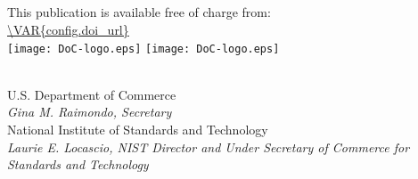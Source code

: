 \begin{titlepage}
\begin{flushright}
\normalsize {}\\
\textit{}\\
\textit{}\\
\textit{}\\
\vfill
\vfill
\normalsize This publication is available free of charge from:\\
\url{\VAR{config.doi_url}}\\
\vfill
\normalsize {}
\vfill
	\texttt{[image: DoC-logo.eps]} 
	\tagmcend\tagstructend
	\texttt{[image: DoC-logo.eps]} 

\\
\vfill
\footnotesize U.S. Department of Commerce\\ 
\textit{Gina M. Raimondo, Secretary}\\
\vspace{10pt}
National Institute of Standards and Technology\\ 
\hspace*{-3cm}\textit{Laurie E. Locascio, NIST Director and Under Secretary of Commerce for Standards and Technology}  
\end{flushright}
\end{titlepage}


